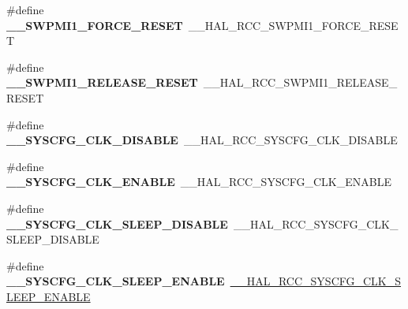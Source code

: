 \begin{DoxyCompactItemize}
\item 
\hypertarget{group___h_a_l___r_c_c___aliased_ga9c0a8cbe546be45dd7c7f0d901b2db76}{\#define {\bfseries \-\_\-\-\_\-\-S\-W\-P\-M\-I1\-\_\-\-F\-O\-R\-C\-E\-\_\-\-R\-E\-S\-E\-T}~\-\_\-\-\_\-\-H\-A\-L\-\_\-\-R\-C\-C\-\_\-\-S\-W\-P\-M\-I1\-\_\-\-F\-O\-R\-C\-E\-\_\-\-R\-E\-S\-E\-T}\label{group___h_a_l___r_c_c___aliased_ga9c0a8cbe546be45dd7c7f0d901b2db76}

\item 
\hypertarget{group___h_a_l___r_c_c___aliased_ga7284a029f95a64809fe509d99fbce6f2}{\#define {\bfseries \-\_\-\-\_\-\-S\-W\-P\-M\-I1\-\_\-\-R\-E\-L\-E\-A\-S\-E\-\_\-\-R\-E\-S\-E\-T}~\-\_\-\-\_\-\-H\-A\-L\-\_\-\-R\-C\-C\-\_\-\-S\-W\-P\-M\-I1\-\_\-\-R\-E\-L\-E\-A\-S\-E\-\_\-\-R\-E\-S\-E\-T}\label{group___h_a_l___r_c_c___aliased_ga7284a029f95a64809fe509d99fbce6f2}

\item 
\hypertarget{group___h_a_l___r_c_c___aliased_gaf304a1951b4254ea8aa1ee909338cd55}{\#define {\bfseries \-\_\-\-\_\-\-S\-Y\-S\-C\-F\-G\-\_\-\-C\-L\-K\-\_\-\-D\-I\-S\-A\-B\-L\-E}~\-\_\-\-\_\-\-H\-A\-L\-\_\-\-R\-C\-C\-\_\-\-S\-Y\-S\-C\-F\-G\-\_\-\-C\-L\-K\-\_\-\-D\-I\-S\-A\-B\-L\-E}\label{group___h_a_l___r_c_c___aliased_gaf304a1951b4254ea8aa1ee909338cd55}

\item 
\hypertarget{group___h_a_l___r_c_c___aliased_gade2f257c0606454f62a43e92c9f4da16}{\#define {\bfseries \-\_\-\-\_\-\-S\-Y\-S\-C\-F\-G\-\_\-\-C\-L\-K\-\_\-\-E\-N\-A\-B\-L\-E}~\-\_\-\-\_\-\-H\-A\-L\-\_\-\-R\-C\-C\-\_\-\-S\-Y\-S\-C\-F\-G\-\_\-\-C\-L\-K\-\_\-\-E\-N\-A\-B\-L\-E}\label{group___h_a_l___r_c_c___aliased_gade2f257c0606454f62a43e92c9f4da16}

\item 
\hypertarget{group___h_a_l___r_c_c___aliased_gaec495cd65b4cd9c5794dc26ab0a99cb8}{\#define {\bfseries \-\_\-\-\_\-\-S\-Y\-S\-C\-F\-G\-\_\-\-C\-L\-K\-\_\-\-S\-L\-E\-E\-P\-\_\-\-D\-I\-S\-A\-B\-L\-E}~\-\_\-\-\_\-\-H\-A\-L\-\_\-\-R\-C\-C\-\_\-\-S\-Y\-S\-C\-F\-G\-\_\-\-C\-L\-K\-\_\-\-S\-L\-E\-E\-P\-\_\-\-D\-I\-S\-A\-B\-L\-E}\label{group___h_a_l___r_c_c___aliased_gaec495cd65b4cd9c5794dc26ab0a99cb8}

\item 
\hypertarget{group___h_a_l___r_c_c___aliased_ga8c0a2b49a38b694b40590201c0798236}{\#define {\bfseries \-\_\-\-\_\-\-S\-Y\-S\-C\-F\-G\-\_\-\-C\-L\-K\-\_\-\-S\-L\-E\-E\-P\-\_\-\-E\-N\-A\-B\-L\-E}~\hyperlink{group___r_c_c___peripheral___clock___sleep___enable___disable_ga6e3a8ca9e554e3aa7aba57d034725655}{\-\_\-\-\_\-\-H\-A\-L\-\_\-\-R\-C\-C\-\_\-\-S\-Y\-S\-C\-F\-G\-\_\-\-C\-L\-K\-\_\-\-S\-L\-E\-E\-P\-\_\-\-E\-N\-A\-B\-L\-E}}\label{group___h_a_l___r_c_c___aliased_ga8c0a2b49a38b694b40590201c0798236}


\end{DoxyCompactItemize}

